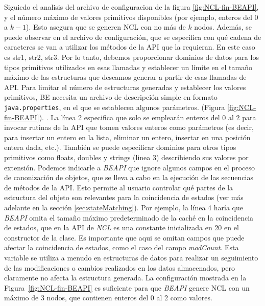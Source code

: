 Siguiedo el analisis del archivo de configuracion de la figura \ref{fig:NCL-fin-BEAPI},
y el número máximo de valores primitivos disponibles (por ejemplo, enteros del 0 a $k-1$). Esto asegura que se generen NCL con no más de $k$ nodos. Además, se puede observar en el archivo de configuración, que se especifica con qué cadena de caracteres se van a utilizar los métodos de la API que la requieran. En este caso es str1, str2, str3.
Por lo tanto, debemos proporcionar dominios de datos para los tipos primitivos utilizados en esas llamadas y establecer un límite en el tamaño máximo de las estructuras que deseamos generar a partir de esas llamadas de API. Para limitar el número de estructuras generadas y establecer los valores primitivos, BE necesita un archivo de descripción simple en formato \texttt{java.properties}, en el que se establecen algunos parámetros. (Figura \ref{fig:NCL-fin-BEAPI}).   .  La línea 2 especifica que solo se emplearán enteros del 0 al 2 para invocar rutinas de la API que tomen valores enteros como parámetros (es decir, para insertar un entero en la lista, eliminar un entero, insertar en una posición entera dada, etc.). También se puede especificar dominios para otros tipos primitivos como floats, doubles y strings (linea 3) describiendo sus valores por extensión. Podemos indicarle a \emph{BEAPI} que ignore algunos campos en el proceso de canonización de objetos, que se lleva a cabo en la ejecución de las secuencias de métodos de la API. Esto permite al usuario controlar qué partes de la estructura del objeto son relevantes para la coincidencia de estados (ver más adelante en la sección \ref{sec:stateMatching}). Por ejemplo,  la línea 4 haría que \emph{BEAPI} omita el tamaño máximo predeterminado de la caché en la coincidencia de estados, que en la API de \emph{NCL} es una constante inicializada en 20 en el constructor de la clase. Es importante que aqui se omitan campos que puede afectar la coincidencia de estados, como el caso del campo \emph{modCount}. Esta variable se utiliza a menudo en estructuras de datos para realizar un seguimiento de las modificaciones o cambios realizados en los datos almacenados, pero claramente no afecta la estructura generada. 
La configuración mostrada en la Figura~\ref{fig:NCL-fin-BEAPI} es suficiente para que \emph{BEAPI} genere NCL con un máximo de 3 nodos, que contienen enteros del 0 al 2 como valores. 
\\

